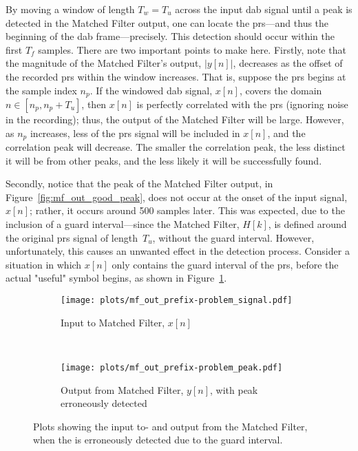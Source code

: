\documentclass[class=report,11pt,crop=false]{standalone}
\begin{document}
By moving a window of length \(T_w = T_u\) across the input \gls{dab} signal until a peak is detected in the Matched Filter output, one can locate the \gls{prs}---and thus the beginning of the \gls{dab} frame---precisely. This detection should occur within the first \(T_f\) samples. There are two important points to make here. Firstly, note that the magnitude of the Matched Filter's output, \(|y[n]|\), decreases as the offset of the recorded \gls{prs} within the window increases. That is, suppose the \gls{prs} begins at the sample index \(n_p\). If the windowed \gls{dab} signal, \(x[n]\), covers the domain \(n \in [n_p, n_p + T_u]\), then \(x[n]\) is perfectly correlated with the \gls{prs} (ignoring noise in the recording); thus, the output of the Matched Filter will be large. However, as \(n_p\) increases, less of the \gls{prs} signal will be included in \(x[n]\), and the correlation peak will decrease. The smaller the correlation peak, the less distinct it will be from other peaks, and the less likely it will be successfully found.

Secondly, notice that the peak of the Matched Filter output, in Figure~\ref{fig:mf_out_good_peak}, does not occur at the onset of the input signal, \(x[n]\); rather, it occurs around 500 samples later. This was expected, due to the inclusion of a guard interval---since the Matched Filter, \(H[k]\), is defined around the original \gls{prs} signal of length~\(T_u\), without the guard interval. However, unfortunately, this causes an unwanted effect in the detection process. Consider a situation in which \(x[n]\) only contains the guard interval of the \gls{prs}, before the actual "useful" symbol begins, as shown in Figure~\ref{fig:mf_out_prefix-problem_signal}.

\begin{figure}[htbp]
  \centering
  \captionsetup{type=figure}
  \begin{subfigure}[t]{\textwidth}
    \centering
    \captionsetup{type=figure}
    \texttt{[image: plots/mf\_out\_prefix-problem\_signal.pdf]}
    \caption{Input to Matched Filter, \(x[n]\)}
    \label{fig:mf_out_prefix-problem_signal}
  \end{subfigure}%
  \\
  \begin{subfigure}[t]{\textwidth}
    \centering
    \captionsetup{type=figure}
    \texttt{[image: plots/mf\_out\_prefix-problem\_peak.pdf]}
    \caption{Output from Matched Filter, \(y[n]\), with peak erroneously detected}
    \label{fig:mf_out_prefix-problem_peak}
  \end{subfigure}
  \caption{Plots showing the input to- and output from the Matched Filter, when the  is erroneously detected due to the guard interval.}
  \label{fig:mf_out_prefix-problem}
\end{figure}
\end{document}
